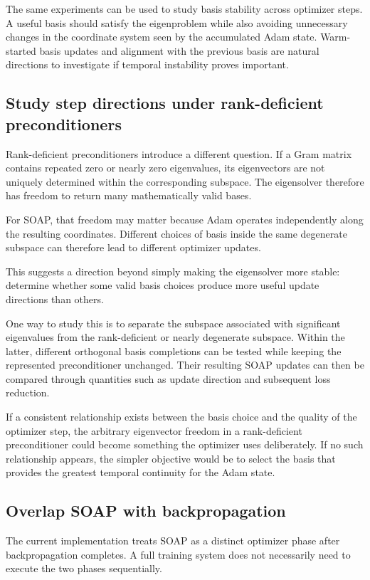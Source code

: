 \documentclass[11pt]{article}
\begin{document}
The same experiments can be used to study basis stability across optimizer steps. A useful basis should satisfy the eigenproblem while also avoiding unnecessary changes in the coordinate system seen by the accumulated Adam state. Warm-started basis updates and alignment with the previous basis are natural directions to investigate if temporal instability proves important.

\subsection{Study step directions under rank-deficient preconditioners}

Rank-deficient preconditioners introduce a different question. If a Gram matrix contains repeated zero or nearly zero eigenvalues, its eigenvectors are not uniquely determined within the corresponding subspace. The eigensolver therefore has freedom to return many mathematically valid bases.

For SOAP, that freedom may matter because Adam operates independently along the resulting coordinates. Different choices of basis inside the same degenerate subspace can therefore lead to different optimizer updates.

This suggests a direction beyond simply making the eigensolver more stable: determine whether some valid basis choices produce more useful update directions than others.

One way to study this is to separate the subspace associated with significant eigenvalues from the rank-deficient or nearly degenerate subspace. Within the latter, different orthogonal basis completions can be tested while keeping the represented preconditioner unchanged. Their resulting SOAP updates can then be compared through quantities such as update direction and subsequent loss reduction.

If a consistent relationship exists between the basis choice and the quality of the optimizer step, the arbitrary eigenvector freedom in a rank-deficient preconditioner could become something the optimizer uses deliberately. If no such relationship appears, the simpler objective would be to select the basis that provides the greatest temporal continuity for the Adam state.

\subsection{Overlap SOAP with backpropagation}

The current implementation treats SOAP as a distinct optimizer phase after backpropagation completes. A full training system does not necessarily need to execute the two phases sequentially.
\end{document}
